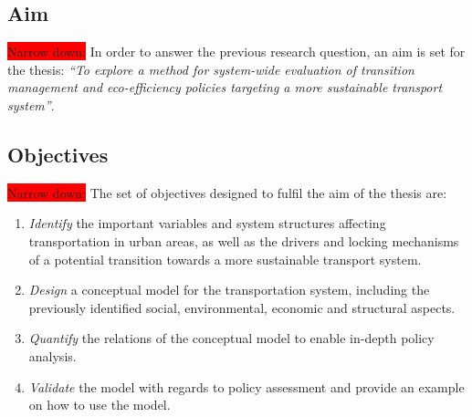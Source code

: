 \documentclass[a4paper,fontsize=10pt,bibliography=totoc]{scrartcl}
\begin{document}
\begin{multicols}{2}
\subsection*{Aim}
\colorbox{red}{Narrow down:}
In order to answer the previous research question, an aim is set for the thesis: \textit{``To explore a method for system-wide evaluation of transition management and eco-efficiency policies targeting a more sustainable transport system''}.

\subsection*{Objectives}
\colorbox{red}{Narrow down:}
The set of objectives designed to fulfil the aim of the thesis are:
\begin{enumerate}[label=(\alph*)]
	\item \textit{Identify} the important variables and system structures affecting transportation in urban areas, as well as the drivers and locking mechanisms of a potential transition towards a more sustainable transport system.
	\item \textit{Design} a conceptual model for the transportation system, including the previously identified social, environmental, economic and structural aspects.
	\item \textit{Quantify} the relations of the conceptual model to enable in-depth policy analysis.
	\item \textit{Validate} the model with regards to policy assessment and provide an example on how to use the model.
\end{enumerate}


\end{multicols}
\end{document}
